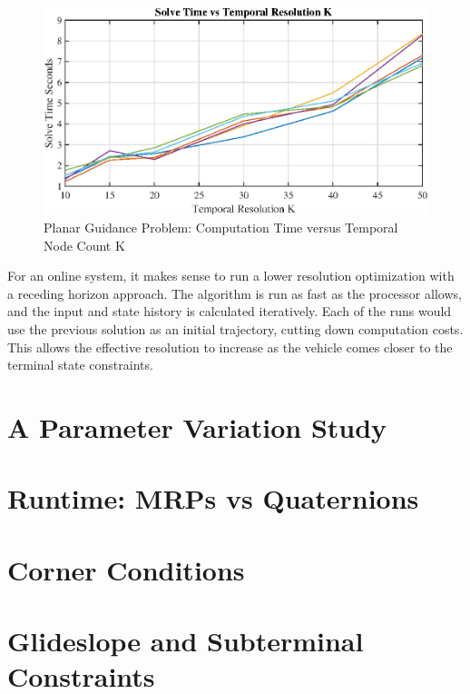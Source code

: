 \begin{figure}[!htbp] 
\label{}
  \centering
  \includegraphics[width=\textwidth]{figs/solvetimevsK.eps}
  \caption{Planar Guidance Problem: Computation Time versus Temporal Node Count K}
  \label{fig:solvetimes}
\end{figure}


For an online system, it makes sense to run a lower resolution optimization with a receding horizon approach. The algorithm is run as fast as the processor allows, and the input and state history is calculated iteratively. Each of the runs would use the previous solution as an initial trajectory, cutting down computation costs. This allows the effective resolution to increase as the vehicle comes closer to the terminal state constraints.


\section{A Parameter Variation Study}

\section{Runtime: MRPs vs Quaternions}

\section{Corner Conditions}

\section{Glideslope and Subterminal Constraints}

